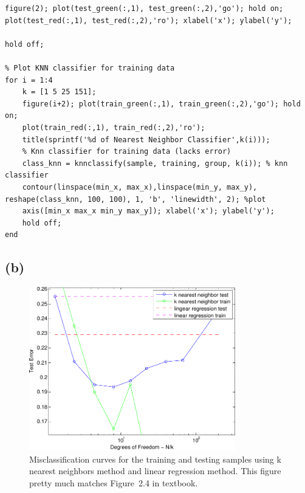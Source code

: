 \documentclass[pra,groupedaddress,amsmath,amssymb, column]{revtex4}
\begin{document}
\begin{verbatim}
figure(2); plot(test_green(:,1), test_green(:,2),'go'); hold on;
plot(test_red(:,1), test_red(:,2),'ro'); xlabel('x'); ylabel('y');

hold off;

% Plot KNN classifier for training data
for i = 1:4
    k = [1 5 25 151];
    figure(i+2); plot(train_green(:,1), train_green(:,2),'go'); hold on;
    plot(train_red(:,1), train_red(:,2),'ro');
    title(sprintf('%d of Nearest Neighbor Classifier',k(i)));
    % Knn classifier for training data (lacks error)
    class_knn = knnclassify(sample, training, group, k(i)); % knn classifier
    contour(linspace(min_x, max_x),linspace(min_y, max_y), reshape(class_knn, 100, 100), 1, 'b', 'linewidth', 2); %plot
    axis([min_x max_x min_y max_y]); xlabel('x'); ylabel('y');
    hold off;
end
\end{verbatim}

\subsection*{(b)}
\begin{figure}
\begin{center}
\includegraphics[width=0.8\textwidth]{Q1b1.pdf} 
\end{center}
\caption{Misclassification curves for the training and testing samples using k nearest neighbors method and linear regression method. This figure pretty much matches Figure~2.4 in textbook.}
\end{figure}
\end{document}
